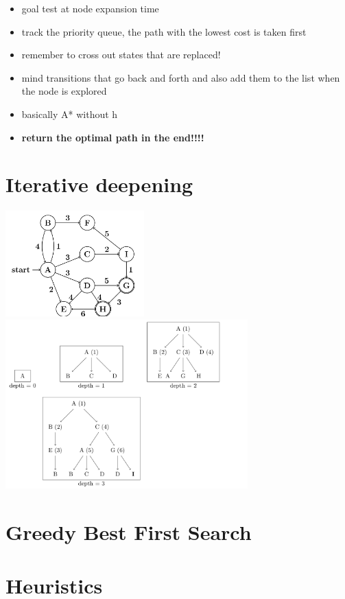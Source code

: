 \documentclass[conference]{styles/acmsiggraph}
\begin{document}
\begin{itemize}
    \item goal test at node expansion time
    \item track the priority queue, the path with the lowest cost is taken first
    \item remember to cross out states that are replaced!
    \item mind transitions that go back and forth and also add them to the list when the node is explored
    \item basically A* without h
    \item \textbf{return the optimal path in the end!!!!}
\end{itemize}

\section{Iterative deepening}

\includegraphics[width=0.4\textwidth]{graph2.png}
\includegraphics[width=0.7\textwidth]{deepening.png}

\section{Greedy Best First Search}


\section{Heuristics}
\end{document}
